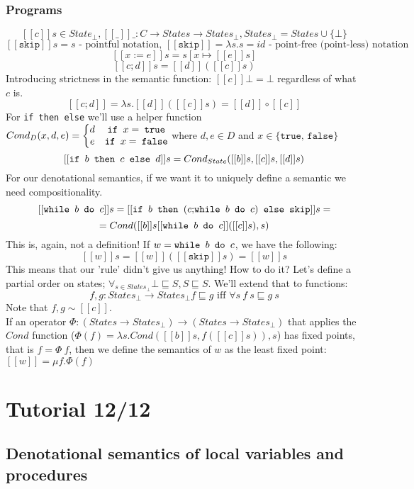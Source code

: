 \documentclass{article}
\begin{document}
\subsubsection{Programs}
$$[[c]]s\in State_\bot, [[\_]]\_:C \rightarrow States \rightarrow States_\bot, States_\bot=States\cup\{\bot\}$$
$$[[\texttt{skip}]]s=s \text{ - pointful notation, }[[\texttt{skip}]]=\lambda s.s=id \text{ - point-free (point-less) notation}$$
$$[[x:=e]]s=s[x\mapsto[[e]]s]$$
$$[[c;d]]s=[[d]]([[c]]s)$$
Introducing strictness in the semantic function: $[[c]]\bot=\bot$ regardless of what $ c $ is.
$$[[c;d]]=\lambda s.[[d]]([[c]]s)=[[d]]\circ[[c]]$$
For \texttt{if then else} we'll use a helper function $ Cond_D(x, d, e)=\bigg\{\begin{matrix}
d&\texttt{if $ x =$ true}\\
e&\texttt{if $ x =$ false}
\end{matrix} $ where $ d, e\in D $ and $ x\in\{\texttt{true, false}\} $
$$[[\texttt{if $ b $ then $ c $ else $ d $}]]s=Cond_{State}([[b]]s,[[c]]s,[[d]]s)$$
For our denotational semantics, if we want it to uniquely define a semantic we need compositionality.
$$[[\texttt{while $ b $ do $ c $}]]s=[[\texttt{if $ b $ then $(c;$while $ b $ do $ c) $ else skip}]]s =$$$$=Cond([[b]]s[[\texttt{while $ b $ do $ c $}]]([[c]]s), s)$$
This is, again, not a definition! 
If $w=\texttt{while $ b $ do $ c $}$, we have the following:
$$[[w]]s=[[w]]([[\texttt{skip}]]s)=[[w]]s$$
This means that our 'rule' didn't give us anything! How to do it?
Let's define a partial order on states; $ \forall_{s\in States_\bot} \bot\sqsubseteq S, S\sqsubseteq S$. We'll extend that to functions:
$$f,g : States_\bot \rightarrow States_\bot f\sqsubseteq g \text{ iff } \forall s\ f\ s\sqsubseteq g\ s$$
Note that $ f,g\sim[[c]] $.\\
If an operator $ \Phi : (States \rightarrow States_\bot) \rightarrow (States \rightarrow States_\bot)$ that applies the $ Cond $ function ($ \Phi(f)=\lambda s.Cond([[b]]s, f([[c]]s)),s $) has fixed points, that is $ f=\Phi\ f $, then we define the semantics of $ w $ as the least fixed point: $ [[w]]=\mu f.\Phi(f) $

\section{Tutorial 12/12}
\subsection{Denotational semantics of local variables and procedures}
\end{document}
